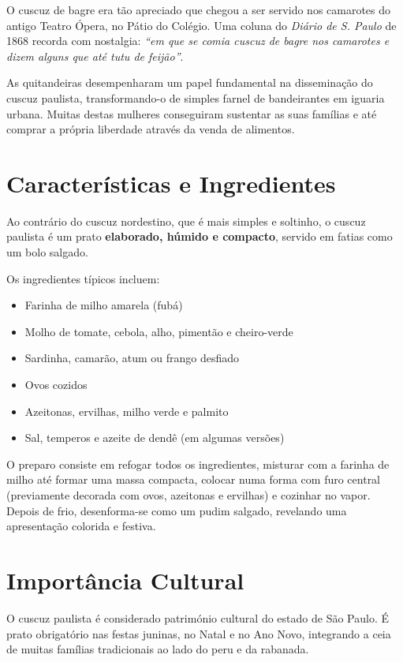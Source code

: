 \documentclass[12pt,a4paper,openright]{book}
\begin{document}
O cuscuz de bagre era tão apreciado que chegou a ser servido nos camarotes do antigo Teatro Ópera, no Pátio do Colégio. Uma coluna do \textit{Diário de S. Paulo} de 1868 recorda com nostalgia: \textit{“em que se comia cuscuz de bagre nos camarotes e dizem alguns que até tutu de feijão”}.

As quitandeiras desempenharam um papel fundamental na disseminação do cuscuz paulista, transformando-o de simples farnel de bandeirantes em iguaria urbana. Muitas destas mulheres conseguiram sustentar as suas famílias e até comprar a própria liberdade através da venda de alimentos.

\section{Características e Ingredientes}

Ao contrário do cuscuz nordestino, que é mais simples e soltinho, o cuscuz paulista é um prato \textbf{elaborado, húmido e compacto}, servido em fatias como um bolo salgado.

Os ingredientes típicos incluem:
\begin{itemize}
    \item Farinha de milho amarela (fubá)
    \item Molho de tomate, cebola, alho, pimentão e cheiro-verde
    \item Sardinha, camarão, atum ou frango desfiado
    \item Ovos cozidos
    \item Azeitonas, ervilhas, milho verde e palmito
    \item Sal, temperos e azeite de dendê (em algumas versões)
\end{itemize}

O preparo consiste em refogar todos os ingredientes, misturar com a farinha de milho até formar uma massa compacta, colocar numa forma com furo central (previamente decorada com ovos, azeitonas e ervilhas) e cozinhar no vapor. Depois de frio, desenforma-se como um pudim salgado, revelando uma apresentação colorida e festiva.

\section{Importância Cultural}

O cuscuz paulista é considerado património cultural do estado de São Paulo. É prato obrigatório nas festas juninas, no Natal e no Ano Novo, integrando a ceia de muitas famílias tradicionais ao lado do peru e da rabanada.
\end{document}
